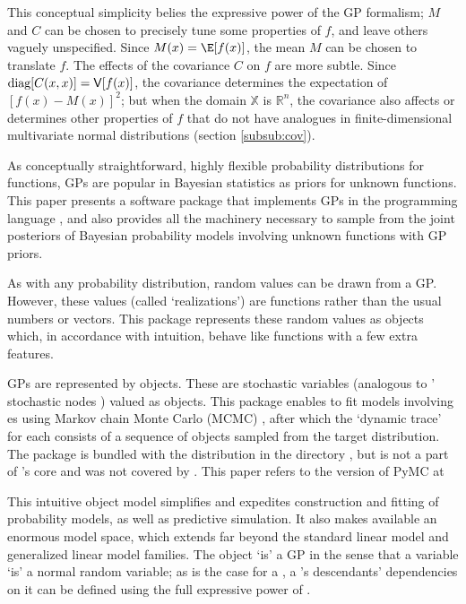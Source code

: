 \documentclass[article]{jss}
\begin{document}
This conceptual simplicity belies the expressive power of the GP formalism; $M$ and $C$ can be chosen to precisely tune some properties of $f$, and leave others vaguely unspecified. Since $M(x)=\E[f(x)]$, the mean $M$ can be chosen to translate $f$. The effects of the covariance $C$ on $f$ are more subtle. Since $\textup{diag}[C(x,x)]=\mathsf{V}[f(x)]$, the covariance determines the expectation of $[f(x)-M(x)]^2$; but when the domain $\mathbb X$ is $\mathbb R^n$, the covariance also affects or determines other properties of $f$ that do not have analogues in finite-dimensional multivariate normal distributions (section \ref{subsub:cov}).

\bigskip
As conceptually straightforward, highly flexible probability distributions for functions, GPs are popular in Bayesian statistics as priors for unknown functions. This paper presents a software package that implements GPs in the programming language , and also provides all the machinery necessary to sample from the joint posteriors of Bayesian probability models involving unknown functions with GP priors.

As with any probability distribution, random values can be drawn from a GP. However, these values (called `realizations') are functions rather than the usual numbers or vectors. This package represents these random values as  objects which, in accordance with intuition, behave like  functions with a few extra features.

GPs are represented by  objects. These are  stochastic variables (analogous to ' stochastic nodes \citep{bugs}) valued as  objects. This package enables  to fit models involving es using Markov chain Monte Carlo (MCMC) \citep{gamerman}, after which the `dynamic trace' for each  consists of a sequence of  objects sampled from the target distribution. The package is bundled with the  distribution in the directory , but is not a part of 's core and was not covered by \cite{pymc}. This paper refers to the version of PyMC at \href{}{} 

This intuitive object model simplifies and expedites construction and fitting of probability models, as well as predictive simulation. It also makes available an enormous model space, which extends far beyond the standard linear model and generalized linear model families. The  object `is' a GP in the sense that a   variable `is' a normal random variable; as is the case for a , a 's descendants' dependencies on it can be defined using the full expressive power of .
\end{document}
